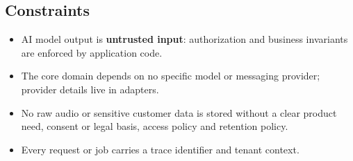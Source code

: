 \subsection{Constraints}
\begin{itemize}
  \item AI model output is \textbf{untrusted input}: authorization and business invariants are enforced by application code.
  \item The core domain depends on no specific model or messaging provider; provider details live in adapters.
  \item No raw audio or sensitive customer data is stored without a clear product need, consent or legal basis, access policy and retention policy.
  \item Every request or job carries a trace identifier and tenant context.
\end{itemize}
